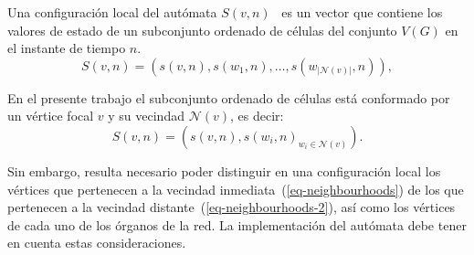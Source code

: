 \begin{definition}
\label{def-local-conf}
Una configuraci\'on local del aut\'omata $S(v,n)$~\cite{book} es un vector que contiene los valores de estado de un subconjunto ordenado de c\'elulas del conjunto $V(G)$ en el instante de tiempo $n$.
\begin{equation}
S(v,n)=\left(s(v,n),s(w_1,n),\ldots,s(w_{|\mathcal{N}(v)|},n)\right), \label{eq-local-conf}
\end{equation}
\end{definition}

En el presente trabajo el subconjunto ordenado de c\'elulas est\'a conformado por un v\'ertice focal $v$ y su vecindad $\mathcal{N}(v)$, es decir:
\begin{equation}
S(v,n)=\left(s(v,n),s(w_i,n)_{w_i \in \mathcal{N}(v)}\right). \label{eq-local-conf-2}
\end{equation}

Sin embargo, resulta necesario poder distinguir en una configuraci\'on local los v\'ertices que pertenecen a la vecindad inmediata~(\ref{eq-neighbourhoods}) de los que pertenecen a la vecindad distante~(\ref{eq-neighbourhoods-2}), as\'i como los v\'ertices de cada uno de los \'organos de la red. La implementaci\'on del aut\'omata debe tener en cuenta estas consideraciones.

